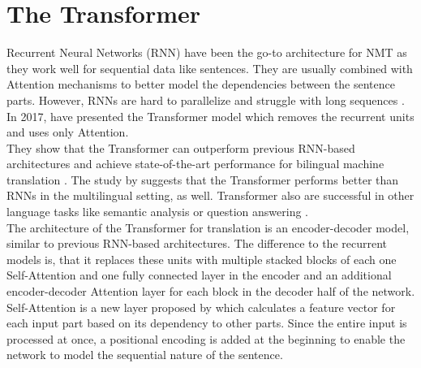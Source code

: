 \documentclass[article,accentcolor=tud8d,bibliography=totoc]{tudreport}
\begin{document}
\section{The Transformer}
Recurrent Neural Networks (RNN) have been the go-to architecture for NMT as they work well for sequential data like sentences.
They are usually combined with Attention mechanisms to better model the dependencies between the sentence parts.
However, RNNs are hard to parallelize and struggle with long sequences \autocite{DBLP:journals/corr/WuSCLNMKCGMKSJL16}.\\
In 2017, \textcite{DBLP:journals/corr/VaswaniSPUJGKP17} have presented the Transformer model which removes the recurrent units and uses only Attention.\\
They show that the Transformer can outperform previous RNN-based architectures and achieve state-of-the-art performance for bilingual machine translation \autocite{DBLP:journals/corr/VaswaniSPUJGKP17}.
The study by \textcite{DBLP:journals/corr/abs-1806-06957} suggests that the Transformer performs better than RNNs in the multilingual setting, as well.
Transformer also are successful in other language tasks like semantic analysis or question answering \autocite{DBLP:journals/corr/abs-1810-04805}.\\
The architecture of the Transformer for translation is an encoder-decoder model, similar to previous RNN-based architectures.
The difference to the recurrent models is, that it replaces these units with multiple stacked blocks of each one Self-Attention and one fully connected layer in the encoder and an additional encoder-decoder Attention layer for each block in the decoder half of the network.\\
Self-Attention is a new layer proposed by \textcite{DBLP:journals/corr/VaswaniSPUJGKP17} which calculates a feature vector for each input part based on its dependency to other parts.
Since the entire input is processed at once, a positional encoding is added at the beginning to enable the network to model the sequential nature of the sentence.
\end{document}

